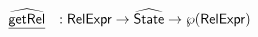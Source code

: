 \[
\begin{array}{ll}

\widehat{\underline{\sf getRel}} & : \mbox{\textsf{RelExpr}} \rightarrow \widehat{\mbox{\textsf{State}}} \rightarrow \wp(\mbox{\textsf{RelExpr}})\\

\end{array}\]
